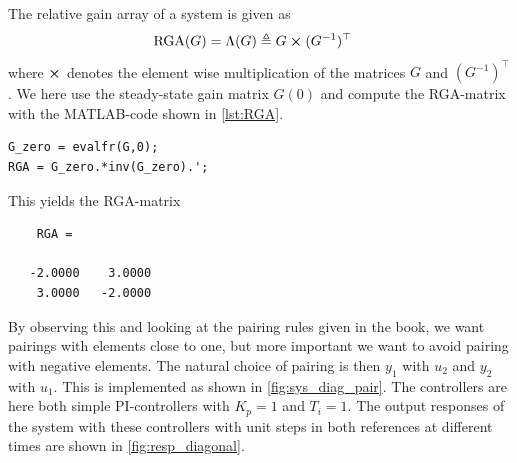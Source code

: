 \documentclass[a4paper]{scrartcl}
\begin{document}
\subsection{}
The relative gain array of a system is given as
\begin{equation}
	\begin{aligned}
		\text{RGA}(G) &= \Lambda(G) \triangleq G \cross (G^{-1})^\top
	\end{aligned}
\end{equation}
where $\cross$ denotes the element wise multiplication of the matrices $G$ and $(G^{-1})^\top$. We here use the steady-state gain matrix $G(0)$ and compute the RGA-matrix with the MATLAB-code shown in \autoref{lst:RGA}.
\begin{lstlisting}[style = matlab-editor, caption = MATLAB code to generate the RGA-matrix, label = lst:RGA]
G_zero = evalfr(G,0);
RGA = G_zero.*inv(G_zero).';
\end{lstlisting}
This yields the RGA-matrix
{\small \begin{verbatim}
	RGA =

   -2.0000    3.0000
    3.0000   -2.0000
\end{verbatim}
}
By observing this and looking at the pairing rules given in the book, we want pairings with elements close to one, but more important we want to avoid pairing with negative elements. The natural choice of pairing is then $y_1$ with $u_2$ and $y_2$ with $u_1$. This is implemented as shown in \autoref{fig:sys_diag_pair}. The controllers are here both simple PI-controllers with $K_p = 1$ and $T_i = 1$. The output responses of the system with these controllers with unit steps in both references at different times are shown in \autoref{fig:resp_diagonal}.
\end{document}
